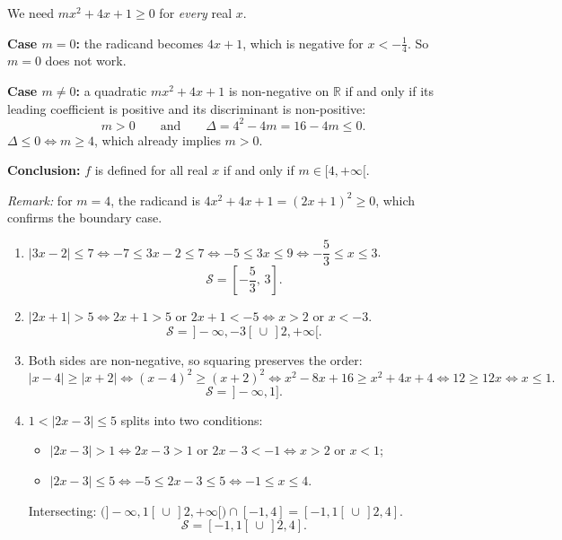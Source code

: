 \documentclass[11pt]{article}
\begin{document}
\begin{corrige}
We need $mx^{2}+4x+1\geq 0$ for \emph{every} real $x$.

\textbf{Case $m=0$:} the radicand becomes $4x+1$, which is negative for $x<-\tfrac14$. So $m=0$ does not work.

\textbf{Case $m\neq 0$:} a quadratic $mx^{2}+4x+1$ is non-negative on $\mathbb{R}$ if and only if its leading coefficient is positive and its discriminant is non-positive:
\[ m>0 \qquad\text{and}\qquad \Delta=4^{2}-4m=16-4m\leq 0. \]
$\Delta\leq 0 \iff m\geq 4$, which already implies $m>0$.

\textbf{Conclusion:} $f$ is defined for all real $x$ if and only if $\boxed{m\in[4,+\infty[}$.

\emph{Remark:} for $m=4$, the radicand is $4x^{2}+4x+1=(2x+1)^{2}\geq 0$, which confirms the boundary case.
\end{corrige}

\begin{corrige}
\begin{enumerate}
\item $|3x-2|\leq 7 \iff -7\leq 3x-2\leq 7 \iff -5\leq 3x\leq 9 \iff -\dfrac{5}{3}\leq x\leq 3$.
\[ \mathcal{S}=\left[-\frac{5}{3},\,3\right]. \]

\item $|2x+1|>5 \iff 2x+1>5$ or $2x+1<-5 \iff x>2$ or $x<-3$.
\[ \mathcal{S}=\,]-\infty,-3[\,\cup\,]2,+\infty[. \]

\item Both sides are non-negative, so squaring preserves the order:
\[ |x-4|\geq|x+2| \iff (x-4)^{2}\geq(x+2)^{2} \iff x^{2}-8x+16\geq x^{2}+4x+4 \iff 12\geq 12x \iff x\leq 1. \]
\[ \mathcal{S}=\,]-\infty,1]. \]

\item $1<|2x-3|\leq 5$ splits into two conditions:
\begin{itemize}
\item $|2x-3|>1 \iff 2x-3>1$ or $2x-3<-1 \iff x>2$ or $x<1$;
\item $|2x-3|\leq 5 \iff -5\leq 2x-3\leq 5 \iff -1\leq x\leq 4$.
\end{itemize}
Intersecting: $\big(]-\infty,1[\,\cup\,]2,+\infty[\big)\cap[-1,4]=[-1,1[\,\cup\,]2,4]$.
\[ \mathcal{S}=[-1,1[\,\cup\,]2,4]. \]
\end{enumerate}
\end{corrige}
\end{document}
